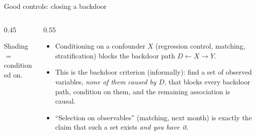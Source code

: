 \documentclass[aspectratio=169,11pt]{beamer}
\begin{document}
\begin{frame}{Good controls: closing a backdoor}
\begin{columns}
\begin{column}{0.45\textwidth}
\begin{center}
\end{center}
\smallskip
{\small Shading $=$ conditioned on.}
\end{column}
\begin{column}{0.55\textwidth}
\begin{itemize}
	\item Conditioning on a \alert{confounder} $X$ (regression control, matching,
	stratification) \alert{blocks} the backdoor path $D \leftarrow X \rightarrow Y$.

	\item This is the \alert{backdoor criterion} (informally): find a set of observed
	variables, \emph{none of them caused by $D$}, that blocks every backdoor path, condition on them, and the remaining
	association is causal.

	\item ``Selection on observables'' (matching, next month) is exactly the claim
	that such a set exists \emph{and you have it}.
\end{itemize}
\end{column}
\end{columns}
\end{frame}
\end{document}
